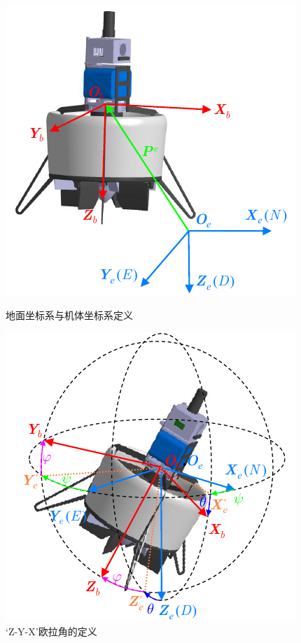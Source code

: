 \begin{figure}[htbp]
	\centering
	\begin{minipage}[c]{0.5\textwidth}
		\centering
		\includegraphics[scale=1]{Fig/坐标系.pdf}
		\caption{\label{坐标系}地面坐标系与机体坐标系定义}
	\end{minipage}%
    \begin{minipage}[c]{0.5\textwidth}
		\centering
		\includegraphics[scale=1]{Fig/欧拉角.pdf}
		\caption{\label{欧拉角}‘Z-Y-X’欧拉角的定义}
	\end{minipage}%
\end{figure}

